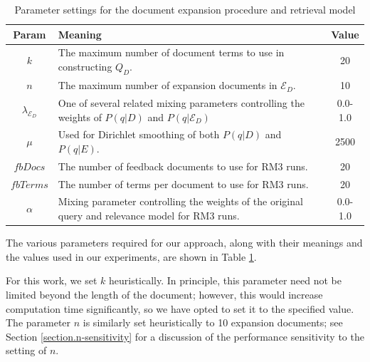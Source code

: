 \documentclass{article}
\begin{document}
\begin{table}[htb]
\centering
\begin{tabular}{|c|p{}|c|} \hline
{\bf Param} & {\bf Meaning} & {\bf Value} \\ \hline
$k$ & The maximum number of document terms to use in constructing $Q_D$. & 20 \\ \hline
$n$ & The maximum number of expansion documents in $\mathcal{E}_D$. & 10 \\ \hline
$\lambda_{\mathcal{E}_D}$ & One of several related mixing parameters controlling the weights of $P(q|D)$ and $P(q|\mathcal{E}_D)$ & 0.0-1.0 \\ \hline
$\mu$ & Used for Dirichlet smoothing of both $P(q|D)$ and $P(q|E)$. & 2500 \\ \hline
$fbDocs$ & The number of feedback documents to use for RM3 runs. & 20 \\ \hline
$fbTerms$ & The number of terms per document to use for RM3 runs. & 20 \\ \hline
$\alpha$ & Mixing parameter controlling the weights of the original query and relevance model for RM3 runs. & 0.0-1.0 \\ \hline
\end{tabular}
\caption{Parameter settings for the document expansion procedure and retrieval model}
\label{table.parameters}
\end{table}

The various parameters required for our approach, along with their meanings and the values used in our experiments, are shown in Table \ref{table.parameters}. 


For this work, we set $k$ heuristically. In principle, this parameter need not be limited beyond the length of the document; however, this would increase computation time significantly, so we have opted to set it to the specified value. The parameter $n$ is similarly set heuristically to 10 expansion documents; see Section \ref{section.n-sensitivity} for a discussion of the performance sensitivity to the setting of $n$.

\end{document}
